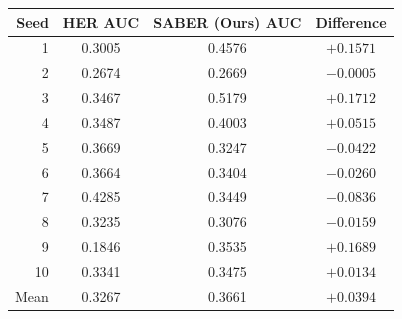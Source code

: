 \centering
\small
\setlength{\tabcolsep}{2.5pt}
\begin{tabular}{@{}rccc@{}}
\toprule
Seed & HER AUC & SABER (Ours) AUC & Difference \\
\midrule
1 & 0.3005 & 0.4576 & $+0.1571$ \\
2 & 0.2674 & 0.2669 & $-0.0005$ \\
3 & 0.3467 & 0.5179 & $+0.1712$ \\
4 & 0.3487 & 0.4003 & $+0.0515$ \\
5 & 0.3669 & 0.3247 & $-0.0422$ \\
6 & 0.3664 & 0.3404 & $-0.0260$ \\
7 & 0.4285 & 0.3449 & $-0.0836$ \\
8 & 0.3235 & 0.3076 & $-0.0159$ \\
9 & 0.1846 & 0.3535 & $+0.1689$ \\
10 & 0.3341 & 0.3475 & $+0.0134$ \\
\midrule
Mean & 0.3267 & 0.3661 & $+0.0394$ \\
\bottomrule
\end{tabular}
\label{tab:supp-fpp-td3-inclusive-future}
